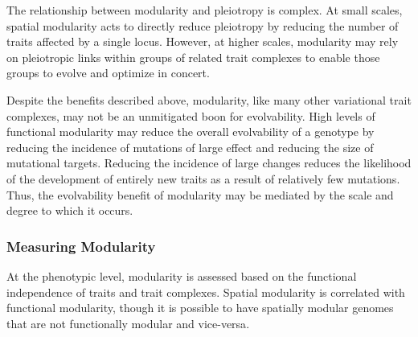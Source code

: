 \documentclass[PhD]{msu-thesis}
\begin{document}
The relationship between modularity and pleiotropy is complex. At small scales, spatial modularity acts to directly reduce pleiotropy by reducing the number of traits affected by a single locus\cite{misevic_sexual_2006}. However, at higher scales, modularity may rely on pleiotropic links within groups of related trait complexes to enable those groups to evolve and optimize in concert\cite{gunter_p._wagner_pleiotropic_2011}. 

Despite the benefits described above, modularity, like many other variational trait complexes, may not be an unmitigated boon for evolvability. High levels of functional modularity may reduce the overall evolvability of a genotype by reducing the incidence of mutations of large effect and reducing the size of mutational targets\cite{hansen_is_2003}. Reducing the incidence of large changes reduces the likelihood of the development of entirely new traits as a result of relatively few mutations. Thus, the evolvability benefit of modularity may be mediated by the scale and degree to which it occurs.


\subsubsection{Measuring Modularity}
At the phenotypic level, modularity is assessed based on the functional independence of traits and trait complexes. Spatial modularity is correlated with functional modularity, though it is possible to have spatially modular genomes that are not functionally modular and vice-versa\cite{pavlicev_model_2012,mezey_is_2000}.  
\end{document}
